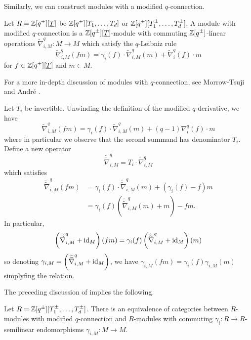 Similarly, we can construct modules with a modified $q$-connection. 
\begin{definition}\label{def: modified q-connections on modules}
    Let $R=\mathbb{Z}[q^{\pm}][\underline{T}]$ be $\mathbb{Z}[q^{\pm}][T_{1},\dots,T_{d}]$ or $\mathbb{Z}[q^{\pm}][T_{1}^{\pm},\dots,T_{d}^{\pm}]$. A module with modified $q$-connection is a $\mathbb{Z}[q^{\pm}][\underline{T}]$-module with commuting $\mathbb{Z}[q^{\pm}]$-linear operations $\widetilde{\nabla}_{i,M}^{q}:M\to M$ which satisfy the $q$-Leibniz rule 
    $$\widetilde{\nabla}_{i,M}^{q}(fm)=\gamma_{i}(f)\cdot\widetilde{\nabla}_{i,M}^{q}(m)+\widetilde{\nabla}_{i}^{q}(f)\cdot m$$
    for $f\in \mathbb{Z}[q^{\pm}][\underline{T}]$ and $m\in M$.
\end{definition}
\begin{remark}
    For a more in-depth discussion of modules with $q$-connection, see Morrow-Tsuji \cite{MorrowTsuji} and Andr\'{e} \cite{Andre}.
\end{remark}
\begin{remark}\label{rmk: invertible case}
    Let $T_{i}$ be invertible. Unwinding the definition of the modified $q$-derivative, we have
    $$\widetilde{\nabla}_{i,M}^{q}(fm)=\gamma_{i}(f)\cdot\widetilde{\nabla}_{i,M}^{q}(m)+(q-1)\nabla_{i}^{q}(f)\cdot m$$
    where in particular we observe that the second summand has denominator $T_{i}$. Define a new operator 
    $$\widetilde{\widetilde{\nabla}}_{i,M}^{q}=T_{i}\cdot\widetilde{\nabla}_{i,M}^{q}$$
    which satisfies 
    \begin{align*}
        \widetilde{\widetilde{\nabla}}_{i,M}^{q}(fm) &= \gamma_{i}(f)\cdot\widetilde{\widetilde{\nabla}}_{i,M}^{q}(m)+(\gamma_{i}(f)-f)m \\
        &= \gamma_{i}(f)\left(\widetilde{\widetilde{\nabla}}_{i,M}^{q}(m)+m\right)-fm.
    \end{align*}
    In particular, 
    $$\left(\widetilde{\widetilde{\nabla}}_{i,M}^{q}+\mathrm{id}_{M}\right)(fm) = \gamma_{i}(f)\left(\widetilde{\widetilde{\nabla}}_{i,M}^{q}+\mathrm{id}_{M}\right)(m)$$
    so denoting $\gamma_{i,M}=\left(\widetilde{\widetilde{\nabla}}_{i,M}^{q}+\mathrm{id}_{M}\right)$, we have $\gamma_{i,M}(fm)=\gamma_{i}(f)\gamma_{i,M}(m)$ simplyfing the relation. 
\end{remark}
The preceding discussion of  implies the following. 
\begin{corollary}\label{corr: equivalence of q-connection modules and semilinear}
    Let $R=\mathbb{Z}[q^{\pm}][T_{1}^{\pm},\dots,T_{d}^{\pm}]$. There is an equivalence of categories between $R$-modules with modified $q$-connection and $R$-modules with commuting $\gamma_{i}:R\to R$-semilinear endomorphisms $\gamma_{i,M}:M\to M$. 
\end{corollary}
